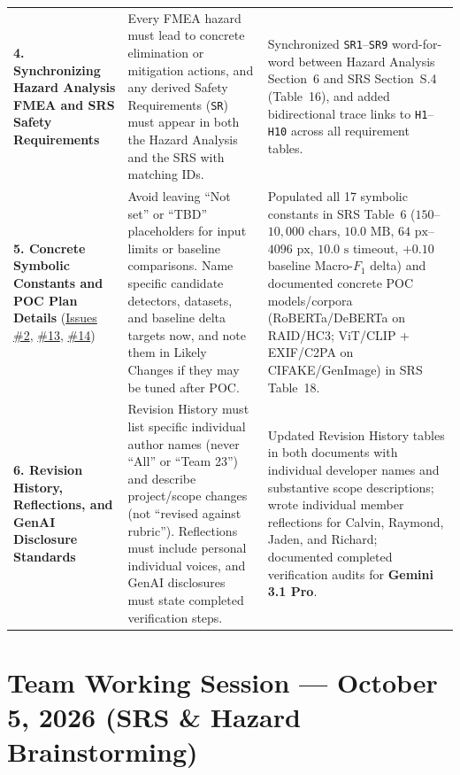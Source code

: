 \documentclass[11pt]{article}
\begin{document}
\begin{tabularx}{\textwidth}{P{3.6cm} P{4.5cm} Y}
\addlinespace
\textbf{4. Synchronizing Hazard Analysis FMEA and SRS Safety Requirements} & Every FMEA hazard must lead to concrete elimination or mitigation actions, and any derived Safety Requirements (\texttt{SR}) must appear in both the Hazard Analysis and the SRS with matching IDs. & Synchronized \texttt{SR1}--\texttt{SR9} word-for-word between Hazard Analysis Section~6 and SRS Section~S.4 (Table~16), and added bidirectional trace links to \texttt{H1}--\texttt{H10} across all requirement tables.\\
\addlinespace
\textbf{5. Concrete Symbolic Constants and POC Plan Details} (\href{https://github.com/richy1337/Verity/issues/2}{Issues \#2}, \href{https://github.com/richy1337/Verity/issues/13}{\#13}, \href{https://github.com/richy1337/Verity/issues/14}{\#14}) & Avoid leaving ``Not set'' or ``TBD'' placeholders for input limits or baseline comparisons. Name specific candidate detectors, datasets, and baseline delta targets now, and note them in Likely Changes if they may be tuned after POC. & Populated all 17 symbolic constants in SRS Table~6 ($150$--$10{,}000\text{ chars}$, $10.0\text{ MB}$, $64\text{ px}$--$4096\text{ px}$, $10.0\text{ s}$ timeout, $+0.10$ baseline Macro-$F_1$ delta) and documented concrete POC models/corpora (RoBERTa/DeBERTa on RAID/HC3; ViT/CLIP + EXIF/C2PA on CIFAKE/GenImage) in SRS Table~18.\\
\addlinespace
\textbf{6. Revision History, Reflections, and GenAI Disclosure Standards} & Revision History must list specific individual author names (never ``All'' or ``Team 23'') and describe project/scope changes (not ``revised against rubric''). Reflections must include personal individual voices, and GenAI disclosures must state completed verification steps. & Updated Revision History tables in both documents with individual developer names and substantive scope descriptions; wrote individual member reflections for Calvin, Raymond, Jaden, and Richard; documented completed verification audits for \textbf{Gemini 3.1 Pro}.\\
\end{tabularx}

\section{Team Working Session --- October 5, 2026 (SRS \& Hazard Brainstorming)}
\end{document}
